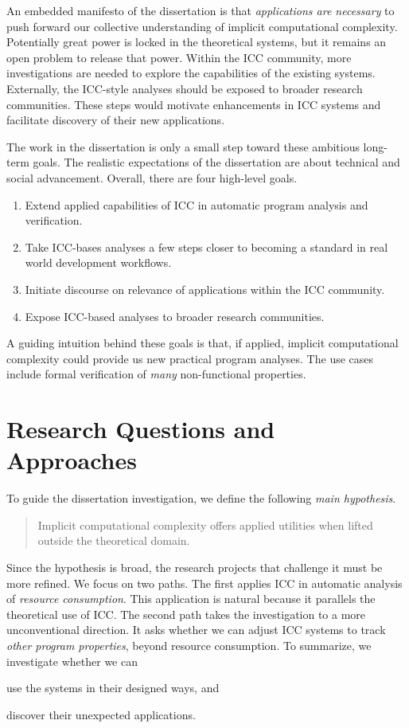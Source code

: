 An embedded manifesto of the dissertation is that \emph{applications are necessary} to push forward our collective understanding of implicit computational complexity.
Potentially great power is locked in the theoretical systems, but it remains an open problem to release that power.
Within the ICC community, more investigations are needed to explore the capabilities of the existing systems.
Externally, the ICC-style analyses should be exposed to broader research communities.
These steps would motivate enhancements in ICC systems and facilitate discovery of their new applications.

The work in the dissertation is only a small step toward these ambitious long-term goals.
The realistic expectations of the dissertation are about technical and social advancement.
Overall, there are four high-level goals.
\begin{enumerate}
\item Extend {applied} capabilities of ICC in automatic program analysis and verification.
\item Take ICC-bases analyses a few steps closer to becoming a standard in real world development workflows.
\item Initiate discourse on relevance of applications within the ICC community.
\item Expose ICC-based analyses to broader research communities.
\end{enumerate}
A guiding intuition behind these goals is that, {if applied}, implicit computational complexity could provide us new practical program analyses.
The use cases include formal verification of \emph{many} non-functional properties.

\section{Research Questions and Approaches}
\label{aicc-approaches}

To guide the dissertation investigation, we define the following \emph{main hypothesis}.
\begin{quote}
\noindent Implicit computational complexity offers applied utilities when lifted outside the theoretical domain.
\end{quote}
Since the hypothesis is broad, the research projects that challenge it must be more refined.
We focus on two paths.
The first applies ICC in automatic analysis of \emph{resource consumption}.
This application is natural because it parallels the theoretical use of ICC.
The second path takes the investigation to a more unconventional direction.
It asks whether we can adjust ICC systems to track \emph{other program properties}, beyond resource consumption.
To summarize, we investigate whether we can
\begin{enumerate*}[label=(\roman*)]
\item use the systems in their designed ways, and
\item discover their unexpected applications.
\end{enumerate*}

